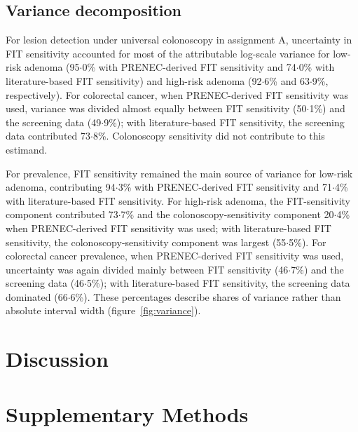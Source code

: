 \documentclass[10pt,a4paper]{article}
\newcommand{\dec}{\ensuremath{\cdot}}
\begin{document}
\subsection*{Variance decomposition}

For lesion detection under universal colonoscopy in assignment A, uncertainty
in FIT sensitivity accounted for most of the attributable log-scale variance
for low-risk adenoma (95\dec{}0\% with PRENEC-derived FIT sensitivity and
74\dec{}0\% with literature-based FIT sensitivity) and high-risk adenoma
(92\dec{}6\% and 63\dec{}9\%, respectively). For colorectal cancer, when
PRENEC-derived FIT sensitivity was used, variance was divided almost equally
between FIT sensitivity (50\dec{}1\%) and the screening data (49\dec{}9\%);
with literature-based FIT sensitivity, the screening data contributed
73\dec{}8\%.
Colonoscopy sensitivity did not contribute to this estimand.

For prevalence, FIT sensitivity remained the main source of variance for
low-risk adenoma, contributing 94\dec{}3\% with PRENEC-derived FIT sensitivity
and 71\dec{}4\% with literature-based FIT sensitivity. For high-risk adenoma,
the FIT-sensitivity component contributed 73\dec{}7\% and the
colonoscopy-sensitivity component 20\dec{}4\% when PRENEC-derived FIT
sensitivity was used; with literature-based FIT sensitivity, the
colonoscopy-sensitivity component was largest (55\dec{}5\%). For colorectal
cancer prevalence, when PRENEC-derived FIT sensitivity was used, uncertainty
was again divided mainly between FIT sensitivity (46\dec{}7\%) and the
screening data (46\dec{}5\%); with literature-based FIT sensitivity, the
screening data dominated (66\dec{}6\%). These percentages describe shares of
variance rather than absolute interval width (figure~\ref{fig:variance}).

\section*{Discussion}

\begin{center}
\end{center}

\clearpage
\section*{Supplementary Methods}
\end{document}
